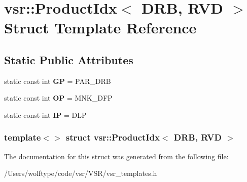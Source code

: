 \hypertarget{structvsr_1_1_product_idx_3_01_d_r_b_00_01_r_v_d_01_4}{\section{vsr\-:\-:Product\-Idx$<$ D\-R\-B, R\-V\-D $>$ Struct Template Reference}
\label{structvsr_1_1_product_idx_3_01_d_r_b_00_01_r_v_d_01_4}
}
\subsection*{Static Public Attributes}
\begin{DoxyCompactItemize}
\item 
\hypertarget{structvsr_1_1_product_idx_3_01_d_r_b_00_01_r_v_d_01_4_aed13a5f3912dedb898f71dae3675598e}{static const int {\bfseries G\-P} = P\-A\-R\-\_\-\-D\-R\-B}\label{structvsr_1_1_product_idx_3_01_d_r_b_00_01_r_v_d_01_4_aed13a5f3912dedb898f71dae3675598e}

\item 
\hypertarget{structvsr_1_1_product_idx_3_01_d_r_b_00_01_r_v_d_01_4_a8d46cb164e8e3ab43f01343b01ceb914}{static const int {\bfseries O\-P} = M\-N\-K\-\_\-\-D\-F\-P}\label{structvsr_1_1_product_idx_3_01_d_r_b_00_01_r_v_d_01_4_a8d46cb164e8e3ab43f01343b01ceb914}

\item 
\hypertarget{structvsr_1_1_product_idx_3_01_d_r_b_00_01_r_v_d_01_4_a8d7d47a860e6e533df085dfa32b95236}{static const int {\bfseries I\-P} = D\-L\-P}\label{structvsr_1_1_product_idx_3_01_d_r_b_00_01_r_v_d_01_4_a8d7d47a860e6e533df085dfa32b95236}

\end{DoxyCompactItemize}
\subsubsection*{template$<$$>$ struct vsr\-::\-Product\-Idx$<$ D\-R\-B, R\-V\-D $>$}



The documentation for this struct was generated from the following file\-:\begin{DoxyCompactItemize}
\item 
/\-Users/wolftype/code/vsr/\-V\-S\-R/vsr\-\_\-templates.\-h\end{DoxyCompactItemize}
